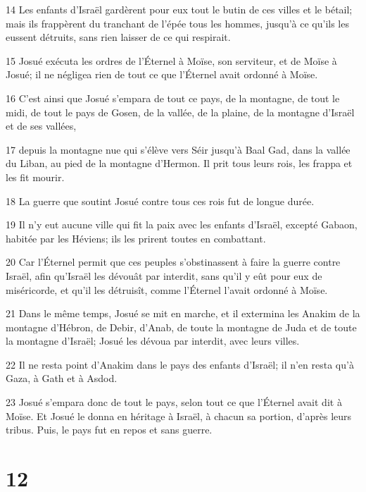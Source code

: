 \par 14 Les enfants d'Israël gardèrent pour eux tout le butin de ces villes et le bétail; mais ils frappèrent du tranchant de l'épée tous les hommes, jusqu'à ce qu'ils les eussent détruits, sans rien laisser de ce qui respirait.
\par 15 Josué exécuta les ordres de l'Éternel à Moïse, son serviteur, et de Moïse à Josué; il ne négligea rien de tout ce que l'Éternel avait ordonné à Moïse.
\par 16 C'est ainsi que Josué s'empara de tout ce pays, de la montagne, de tout le midi, de tout le pays de Gosen, de la vallée, de la plaine, de la montagne d'Israël et de ses vallées,
\par 17 depuis la montagne nue qui s'élève vers Séir jusqu'à Baal Gad, dans la vallée du Liban, au pied de la montagne d'Hermon. Il prit tous leurs rois, les frappa et les fit mourir.
\par 18 La guerre que soutint Josué contre tous ces rois fut de longue durée.
\par 19 Il n'y eut aucune ville qui fit la paix avec les enfants d'Israël, excepté Gabaon, habitée par les Héviens; ils les prirent toutes en combattant.
\par 20 Car l'Éternel permit que ces peuples s'obstinassent à faire la guerre contre Israël, afin qu'Israël les dévouât par interdit, sans qu'il y eût pour eux de miséricorde, et qu'il les détruisît, comme l'Éternel l'avait ordonné à Moïse.
\par 21 Dans le même temps, Josué se mit en marche, et il extermina les Anakim de la montagne d'Hébron, de Debir, d'Anab, de toute la montagne de Juda et de toute la montagne d'Israël; Josué les dévoua par interdit, avec leurs villes.
\par 22 Il ne resta point d'Anakim dans le pays des enfants d'Israël; il n'en resta qu'à Gaza, à Gath et à Asdod.
\par 23 Josué s'empara donc de tout le pays, selon tout ce que l'Éternel avait dit à Moïse. Et Josué le donna en héritage à Israël, à chacun sa portion, d'après leurs tribus. Puis, le pays fut en repos et sans guerre.

\chapter{12}

